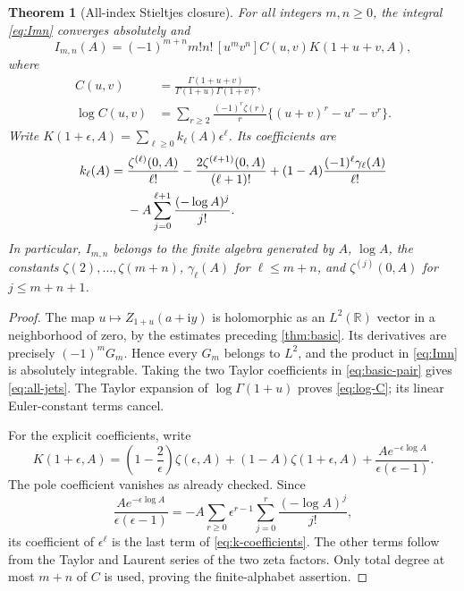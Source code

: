 \documentclass[11pt,a4paper]{article}
\newtheorem{theorem}{Theorem}[section]
\theoremstyle{definition}
\numberwithin{equation}{section}
\newcommand{\R}{\mathbb R}
\newcommand{\ii}{\mathrm i}
\begin{document}
\begin{theorem}[All-index Stieltjes closure]\label{thm:all-stieltjes}
For all integers $m,n\ge0$, the integral \eqref{eq:Imn} converges absolutely
and
\begin{equation}\label{eq:all-jets}
 \boxed{\displaystyle
 I_{m,n}(A)=(-1)^{m+n}m!n!\,[u^mv^n]
      C(u,v)K(1+u+v,A),}
\end{equation}
where
\begin{align}
 C(u,v)&=\frac{\Gamma(1+u+v)}{\Gamma(1+u)\Gamma(1+v)},\label{eq:C}\\
 \log C(u,v)&=\sum_{r\ge2}\frac{(-1)^r\zeta(r)}r
          \{(u+v)^r-u^r-v^r\}.\label{eq:log-C}
\end{align}
Write $K(1+\epsilon,A)=\sum_{\ell\ge0}k_\ell(A)\epsilon^\ell$.
Its coefficients are
\begin{align}
 k_\ell(A)={}&\frac{\zeta^{(\ell)}(0,A)}{\ell!}
  -\frac{2\zeta^{(\ell+1)}(0,A)}{(\ell+1)!}
  +(1-A)\frac{(-1)^\ell\gamma_\ell(A)}{\ell!}\notag\\
 &-A\sum_{j=0}^{\ell+1}\frac{(-\log A)^j}{j!}.
       \label{eq:k-coefficients}
\end{align}
In particular, $I_{m,n}$ belongs to the finite algebra generated by
$A$, $\log A$, the constants $\zeta(2),\ldots,\zeta(m+n)$,
$\gamma_\ell(A)$ for $\ell\le m+n$, and
$\zeta^{(j)}(0,A)$ for $j\le m+n+1$.
\end{theorem}
\begin{proof}
The map $u\mapsto Z_{1+u}(a+\ii y)$ is holomorphic as an $L^2(\R)$ vector
in a neighborhood of zero, by the estimates preceding \cref{thm:basic}.
Its derivatives are precisely $(-1)^mG_m$. Hence every $G_m$ belongs to
$L^2$, and the product in \eqref{eq:Imn} is absolutely integrable.
Taking the two Taylor coefficients in \eqref{eq:basic-pair} gives
\eqref{eq:all-jets}. The Taylor expansion of $\log\Gamma(1+u)$ proves
\eqref{eq:log-C}; its linear Euler-constant terms cancel.

For the explicit coefficients, write
\[
 K(1+\epsilon,A)=\left(1-\frac2\epsilon\right)\zeta(\epsilon,A)
 +(1-A)\zeta(1+\epsilon,A)
 +\frac{A e^{-\epsilon\log A}}{\epsilon(\epsilon-1)}.
\]
The pole coefficient vanishes as already checked. Since
\[
 \frac{Ae^{-\epsilon\log A}}{\epsilon(\epsilon-1)}
 =-A\sum_{r\ge0}\epsilon^{r-1}
          \sum_{j=0}^r\frac{(-\log A)^j}{j!},
\]
its coefficient of $\epsilon^\ell$ is the last term of
\eqref{eq:k-coefficients}. The other terms follow from the Taylor and
Laurent series of the two zeta factors. Only total degree at most $m+n$
of $C$ is used, proving the finite-alphabet assertion.
\end{proof}
\end{document}
